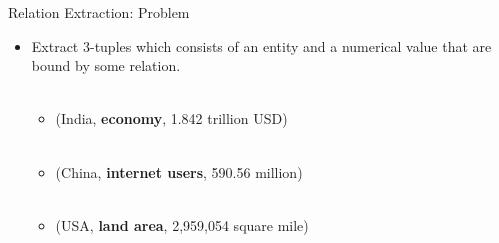 \documentclass{beamer}
\begin{document}
\begin{frame}{Relation Extraction: Problem}
\begin{itemize}
 \item Extract 3-tuples which consists of an entity and a numerical value that are bound by some relation. \\~\\
   
    \begin{itemize}
	\item  (India, \textbf{economy}, 1.842 trillion USD) \\~\\
	\item  (China, \textbf{internet users},  590.56 million) \\~\\
	\item  (USA, \textbf{land area}, 2,959,054 square mile)
    \end{itemize}

 \end{itemize}
\end{frame}

\end{document}
